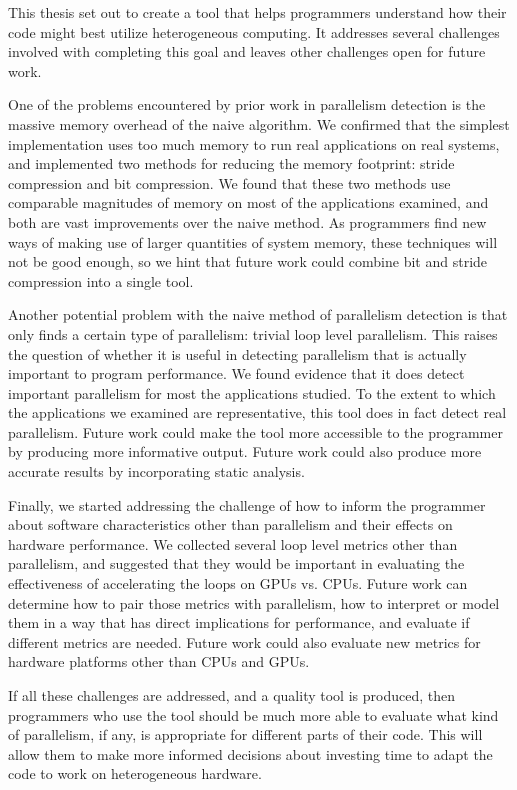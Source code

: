 \documentclass[12pt,twoside]{reedthesis}
\begin{document}
	This thesis set out to create a tool that helps programmers understand how their code might best utilize heterogeneous computing. It addresses several challenges involved with completing this goal and leaves other challenges open for future work. %
	
	One of the problems encountered by prior work in parallelism detection is the massive memory overhead of the naive algorithm.
	We confirmed that the simplest implementation uses too much memory to run real applications on real systems, and implemented two methods for reducing the memory footprint: stride compression and bit compression. We found that these two methods use comparable magnitudes of memory on most of the applications examined, and both are vast improvements over the naive method. As programmers find new ways of making use of larger quantities of system memory, these techniques will not be good enough, so we hint that future work could combine bit and stride compression into a single tool. 
	
	Another potential problem with the naive method of parallelism detection is that only finds a certain type of parallelism: trivial loop level parallelism. This raises the question of whether it is useful in detecting parallelism that is actually important to program performance. We found evidence that it does detect important parallelism for most the applications studied. To the extent to which the applications we examined are representative, this tool does in fact detect real parallelism. 
	Future work could make the tool more accessible to the programmer by producing more informative output. Future work could also produce more accurate results by incorporating static analysis. 
	
	Finally, we started addressing the challenge of how to inform the programmer about software characteristics other than parallelism and their effects on hardware performance. We collected several loop level metrics other than parallelism, and suggested that they would be important in evaluating the effectiveness of accelerating the loops on GPUs vs. CPUs. 
	Future work can determine how to pair those metrics with parallelism, how to interpret or model them in a way that has direct implications for performance, and evaluate if different metrics are needed. Future work could also evaluate new metrics for hardware platforms other than CPUs and GPUs.
	
	If all these challenges are addressed, and a quality tool is produced, then programmers who use the tool should be much more able to evaluate what kind of parallelism, if any, is appropriate for different parts of their code. This will allow them to make more informed decisions about investing time to adapt the code to work on heterogeneous hardware. %
	
\end{document}
